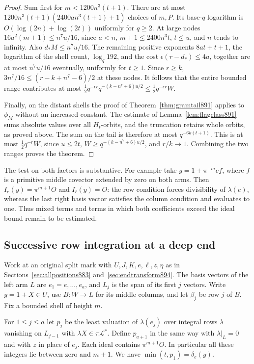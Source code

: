 \documentclass[a4paper,11pt]{article}
\theoremstyle{definition}
\theoremstyle{remark}
\numberwithin{equation}{section}
\begin{document}
\begin{proof}
Sum first for \(m<1200n^3(t+1)\). There are at most
\(1200n^3(t+1)(2400an^3(t+1)+1)\) choices of \(m,P\).
Its base-\(q\) logarithm is \(O(\log(2n)+\log(2t))\) uniformly
for \(q\ge2\). At large nodes \(16a^2(m+1)\le n^7u/16\),
since \(a<n\), \(m+1\le2400n^3t\), \(t\le u\), and \(n\)
tends to infinity. Also \(d_*M\le n^7u/16\). The remaining
positive exponents \(8at+t+1\), the logarithm of the shell
count, \(\log_q192\), and the cost
\(\epsilon(r-d_*)\le4a\), together are at most \(n^7u/16\)
eventually, uniformly for \(t\ge1\). Since \(r\ge k\),
\(3n^7/16\le(r-k+n^7-6)/2\) at these nodes. It follows that
the entire bounded range contributes at most
\(\tfrac12 q^{-\epsilon r}q^{-(k-n^7+6)u/2}
\le\tfrac12 q^{-\epsilon r}W\).

Finally, on the distant shells the proof of
Theorem~\ref{thm:gramtail891} applies to \(\phi_M\) without
an increased constant. The estimate of
Lemma~\ref{lem:flagclass891} sums absolute values over all
\(H_t\)-orbits, and the truncation retains whole orbits, as
proved above. The sum on the tail is therefore at most
\(q^{-6k(t+1)}\). This is at most \(\tfrac12 q^{-r}W\), since
\(u\le2t\), \(W\ge q^{-(k-n^7+6)u/2}\), and \(r/k\to1\).
Combining the two ranges proves the theorem.
\end{proof}

The test on both factors is substantive. For example take
\(y=1+\pi^{-m}e f\), where \(f\) is a primitive middle covector
extended by zero on both arms. Then \(I_e(y)=\pi^{m+1}O\)
and \(I_\ell(y)=O\): the row condition forces divisibility of
\(\lambda(e)\), whereas the last right basis vector satisfies
the column condition and evaluates to one. Thus mixed terms
and terms in which both coefficients exceed the ideal bound
remain to be estimated.
\clearpage

\subsection{Successive row integration at a deep end}
\label{sec:rowdescent895}

Work at an original split mark with \(U,J,K,e,\ell,z,\eta\) as in
Sections~\ref{sec:allpositions883} and~\ref{sec:endtransform894}.
The basis vectors of the left arm \(L\) are \(e_1=e,\ldots,e_a\),
and \(L_j\) is the span of its first \(j\) vectors. Write \(y=1+X\in U\),
use \(B:W\to L\) for its middle columns, and let \(\beta_j\) be row
\(j\) of \(B\). Fix a bounded shell of height \(m\).

For \(1\le j\le a\) let \(p_j\) be the least valuation of
\(\lambda(e_j)\) over integral rows \(\lambda\) vanishing on
\(L_{j-1}\) with \(\lambda X\in\pi\mathcal L^*\). Define \(p_{a+1}\)
in the same way with \(\lambda|_L=0\) and with \(z\) in place of
\(e_j\). Each ideal contains \(\pi^{m+1}O\). In particular all
these integers lie between zero and \(m+1\). We have
\(\min(t,p_1)=\delta_e(y)\).
\end{document}
